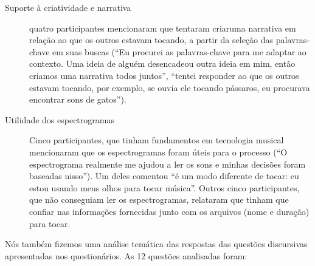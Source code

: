 \begin{description}
\item[Suporte à criatividade e narrativa] quatro participantes mencionaram que tentaram criaruma narrativa em relação ao que os outros estavam tocando, a partir da seleção das palavras-chave em suas buscas (``Eu procurei as palavras-chave para me adaptar ao contexto. Uma ideia de alguém desencadeou outra ideia em mim, então criamos uma narrativa todos juntos'', ``tentei responder ao que os outros estavam tocando, por exemplo, se ouvia ele tocando pássaros, eu procurava encontrar sons de gatos'').

\item[Utilidade dos espectrogramas] Cinco participantes, que tinham fundamentos em tecnologia musical mencionaram que os espectrogramas foram úteis para o processo (``O espectrograma realmente me ajudou a ler os sons e minhas decisões foram baseadas nisso''). Um deles comentou ``é um modo diferente de tocar: eu estou usando meus olhos para tocar música''. Outros cinco participantes, que não conseguiam ler os espectrogramas, relataram que tinham que confiar nas informações fornecidas junto com os arquivos (nome e duração) para tocar.

\end{description}

Nós também fizemos uma análise temática das respostas das questões discursivas apresentadas nos questionários. As 12 questões analisadas foram: 

